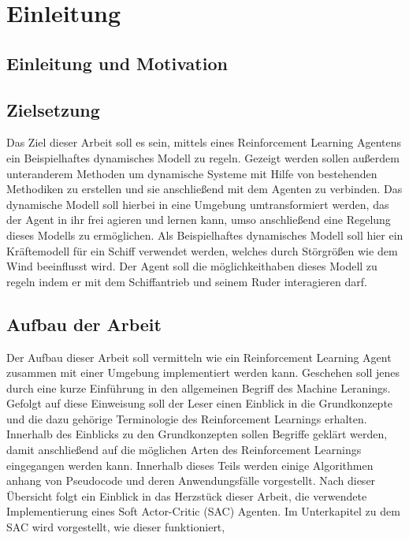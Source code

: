 \documentclass[]{iat}
\begin{document}
\graphicspath{{./project_graphics/}}



\tableofcontents

\newpage

\chapter{Einleitung}

\section{Einleitung und Motivation}

\section{Zielsetzung}
Das Ziel dieser Arbeit soll es sein, mittels eines Reinforcement Learning Agentens ein Beispielhaftes dynamisches Modell zu regeln. Gezeigt werden sollen außerdem unteranderem Methoden um dynamische Systeme mit Hilfe von bestehenden Methodiken zu erstellen und sie anschließend mit dem Agenten zu verbinden. Das dynamische Modell soll hierbei in eine Umgebung umtransformiert werden, das der Agent in ihr frei agieren und lernen kann, umso anschließend eine Regelung dieses Modells zu ermöglichen. Als Beispielhaftes dynamisches Modell soll hier ein Kräftemodell für ein Schiff verwendet werden, welches durch Störgrößen wie dem Wind beeinflusst wird. Der Agent soll die möglichkeithaben dieses Modell zu regeln indem er mit dem Schiffantrieb und seinem Ruder interagieren darf.
\section{Aufbau der Arbeit}
Der Aufbau dieser Arbeit soll vermitteln wie ein Reinforcement Learning Agent zusammen mit einer Umgebung implementiert werden kann. Geschehen soll jenes durch eine kurze Einführung in den allgemeinen Begriff des Machine Leranings. Gefolgt auf diese Einweisung soll der Leser einen Einblick in die Grundkonzepte und die dazu gehörige Terminologie des Reinforcement Learnings erhalten. Innerhalb des Einblicks zu den Grundkonzepten sollen Begriffe geklärt werden, damit anschließend auf die möglichen Arten des Reinforcement Learnings eingegangen werden kann. Innerhalb dieses Teils werden einige Algorithmen anhang von Pseudocode und deren Anwendungsfälle vorgestellt. Nach dieser Übersicht folgt ein Einblick in das Herzstück dieser Arbeit, die verwendete Implementierung eines Soft Actor-Critic (SAC) Agenten. Im Unterkapitel zu dem SAC wird vorgestellt, wie dieser funktioniert,
\end{document}
